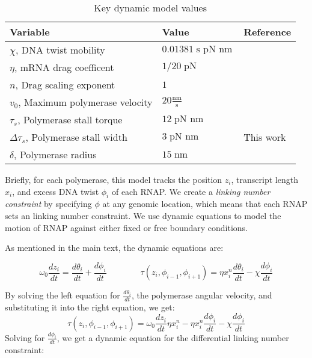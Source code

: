 \documentclass[11pt]{article}
\newcommand{\units}[2]{\frac{\text{#1}}{\text{#2}}\,}
\newcommand{\unit}[1]{\; \text{#1}\,}
\begin{document}
\begin{table}[h]
    \centering
    \begin{tabular}{@{}lll@{}}
        \toprule
        Variable & Value & Reference \\
        \midrule
        \(\chi\), DNA twist mobility  & \(0.01381 \unit{s pN nm}\) & \parencite{sevierPropertiesGeneExpression2018} \\
        \(\eta\), mRNA drag coefficent  & \(1/20 \unit{pN}\) & \parencite{sevierPropertiesGeneExpression2018} \\
        \(n\), Drag scaling exponent  & \(1\) & \parencite{sevierPropertiesGeneExpression2018} \\
        \(v_0\), Maximum polymerase velocity  & \(20 \units{nm}{s}\) & \parencite{sevierPropertiesGeneExpression2018} \\
        \(\tau_s\), Polymerase stall torque  & \(12 \unit{pN nm}\) & \parencite{sevierPropertiesGeneExpression2018} \\
        \(\Delta \tau_s\), Polymerase stall width  & \(3 \unit{pN nm}\) & This work \\
        \(\delta\), Polymerase radius  & \(15 \unit{nm}\) & \parencite{sevierPropertiesGeneExpression2018} \\
        \bottomrule
    \end{tabular}
    \caption{Key dynamic model values}
    \label{tab:dynamic_model_constants}
\end{table}
\FloatBarrier
Briefly, for each polymerase, this model tracks the position \(z_i\), transcript length \(x_i\), and excess DNA twist \(\phi_i\) of each RNAP. We create a \emph{linking number constraint} by specifying \(\phi\) at any genomic location, which means that each RNAP sets an linking number constraint. We use dynamic equations to model the motion of RNAP against either fixed or free boundary conditions.

As mentioned in the main text, the dynamic equations are:

\begin{equation*}
    \omega_0 \frac{d z_i}{dt} = \frac{d \theta_i}{dt} + \frac{d \phi_i}{dt} \qquad \qquad \tau(z_i, \phi_{i-1}, \phi_{i+1}) = \eta x_i^n \frac{d\theta_i}{dt} - \chi \frac{d\phi_i}{dt}
\end{equation*}

By solving the left equation for \(\frac{d \theta_i}{dt}\), the polymerase angular velocity, and substituting it into the right equation, we get:
\[\tau(z_i, \phi_{i-1}, \phi_{i+1}) = \omega_0 \frac{dz_i}{dt} \eta x_i^n - \eta x_i^n \frac{d\phi_i}{dt} - \chi \frac{d\phi_i}{dt}\]
Solving for \(\frac{d\phi_i}{dt}\), we get a dynamic equation for the differential linking number constraint:
\end{document}
